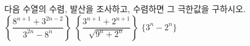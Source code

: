 다음 수열의 수렴, 발산을 조사하고, 수렴하면 그 극한값을 구하시오.
 $\left\{\dfrac{8^{n+1}+3^{2n-2}}{3^{2n}-8^n}\right\}$
 $\left\{\dfrac{3^{n+1}+2^{n+1}}{\sqrt{9^n+2^n}}\right\}$
 $\{3^n-2^n\}$
